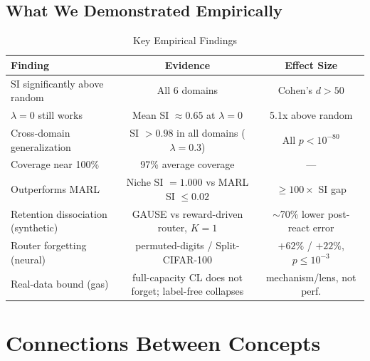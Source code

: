 \documentclass[11pt,a4paper]{article}
\theoremstyle{definition}
\theoremstyle{plain}
\begin{document}
\subsection{What We Demonstrated Empirically}

\begin{table}[h]
\centering
\caption{Key Empirical Findings}
\begin{tabular}{l|c|c}
\toprule
Finding & Evidence & Effect Size \\
\midrule
SI significantly above random & All 6 domains & Cohen's $d > 50$ \\
$\lambda = 0$ still works & Mean SI $\approx 0.65$ at $\lambda = 0$ & 5.1x above random \\
Cross-domain generalization & SI $> 0.98$ in all domains ($\lambda=0.3$) & All $p < 10^{-80}$ \\
Coverage near 100\% & 97\% average coverage & --- \\
Outperforms MARL & Niche SI $=1.000$ vs MARL SI $\le 0.02$ & $\ge 100\times$ SI gap \\
Retention dissociation (synthetic) & GAUSE vs reward-driven router, $K{=}1$ & $\sim$70\% lower post-react error \\
Router forgetting (neural) & permuted-digits / Split-CIFAR-100 & $+62\%$ / $+22\%$, $p\le10^{-3}$ \\
Real-data bound (gas) & full-capacity CL does not forget; label-free collapses & mechanism/lens, not perf. \\
\bottomrule
\end{tabular}
\end{table}

\section{Connections Between Concepts}
\end{document}
